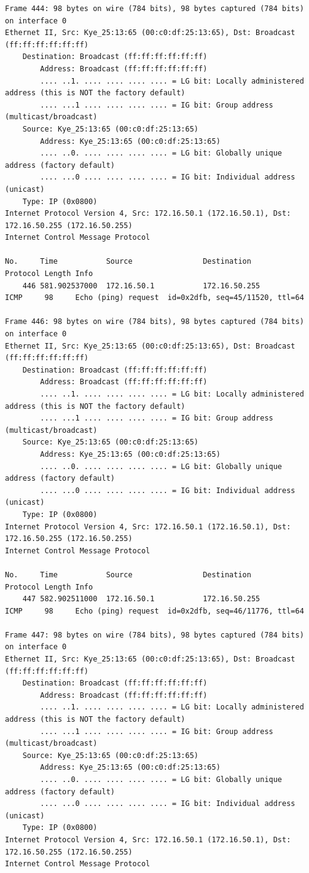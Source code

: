 \documentclass[a4paper,11pt]{article}
\begin{document}
\begin{lstlisting}
Frame 444: 98 bytes on wire (784 bits), 98 bytes captured (784 bits) on interface 0
Ethernet II, Src: Kye_25:13:65 (00:c0:df:25:13:65), Dst: Broadcast (ff:ff:ff:ff:ff:ff)
    Destination: Broadcast (ff:ff:ff:ff:ff:ff)
        Address: Broadcast (ff:ff:ff:ff:ff:ff)
        .... ..1. .... .... .... .... = LG bit: Locally administered address (this is NOT the factory default)
        .... ...1 .... .... .... .... = IG bit: Group address (multicast/broadcast)
    Source: Kye_25:13:65 (00:c0:df:25:13:65)
        Address: Kye_25:13:65 (00:c0:df:25:13:65)
        .... ..0. .... .... .... .... = LG bit: Globally unique address (factory default)
        .... ...0 .... .... .... .... = IG bit: Individual address (unicast)
    Type: IP (0x0800)
Internet Protocol Version 4, Src: 172.16.50.1 (172.16.50.1), Dst: 172.16.50.255 (172.16.50.255)
Internet Control Message Protocol

No.     Time           Source                Destination           Protocol Length Info
    446 581.902537000  172.16.50.1           172.16.50.255         ICMP     98     Echo (ping) request  id=0x2dfb, seq=45/11520, ttl=64

Frame 446: 98 bytes on wire (784 bits), 98 bytes captured (784 bits) on interface 0
Ethernet II, Src: Kye_25:13:65 (00:c0:df:25:13:65), Dst: Broadcast (ff:ff:ff:ff:ff:ff)
    Destination: Broadcast (ff:ff:ff:ff:ff:ff)
        Address: Broadcast (ff:ff:ff:ff:ff:ff)
        .... ..1. .... .... .... .... = LG bit: Locally administered address (this is NOT the factory default)
        .... ...1 .... .... .... .... = IG bit: Group address (multicast/broadcast)
    Source: Kye_25:13:65 (00:c0:df:25:13:65)
        Address: Kye_25:13:65 (00:c0:df:25:13:65)
        .... ..0. .... .... .... .... = LG bit: Globally unique address (factory default)
        .... ...0 .... .... .... .... = IG bit: Individual address (unicast)
    Type: IP (0x0800)
Internet Protocol Version 4, Src: 172.16.50.1 (172.16.50.1), Dst: 172.16.50.255 (172.16.50.255)
Internet Control Message Protocol

No.     Time           Source                Destination           Protocol Length Info
    447 582.902511000  172.16.50.1           172.16.50.255         ICMP     98     Echo (ping) request  id=0x2dfb, seq=46/11776, ttl=64

Frame 447: 98 bytes on wire (784 bits), 98 bytes captured (784 bits) on interface 0
Ethernet II, Src: Kye_25:13:65 (00:c0:df:25:13:65), Dst: Broadcast (ff:ff:ff:ff:ff:ff)
    Destination: Broadcast (ff:ff:ff:ff:ff:ff)
        Address: Broadcast (ff:ff:ff:ff:ff:ff)
        .... ..1. .... .... .... .... = LG bit: Locally administered address (this is NOT the factory default)
        .... ...1 .... .... .... .... = IG bit: Group address (multicast/broadcast)
    Source: Kye_25:13:65 (00:c0:df:25:13:65)
        Address: Kye_25:13:65 (00:c0:df:25:13:65)
        .... ..0. .... .... .... .... = LG bit: Globally unique address (factory default)
        .... ...0 .... .... .... .... = IG bit: Individual address (unicast)
    Type: IP (0x0800)
Internet Protocol Version 4, Src: 172.16.50.1 (172.16.50.1), Dst: 172.16.50.255 (172.16.50.255)
Internet Control Message Protocol


\end{lstlisting}
\end{document}
